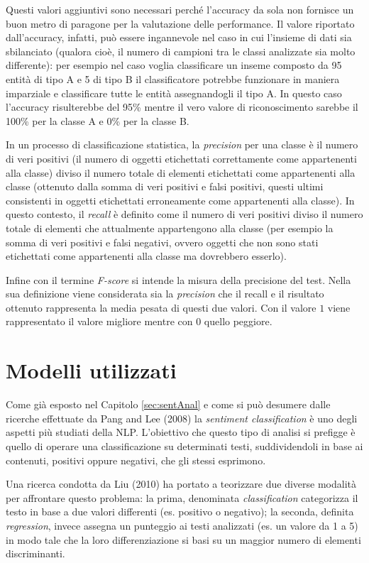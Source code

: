 \documentclass[a4paper,12pt,openright,twoside]{report}
\theoremstyle{definition}
\begin{document}
Questi valori aggiuntivi sono necessari perché l'accuracy da sola non fornisce un buon metro di paragone
per la valutazione delle performance. Il valore riportato dall'accuracy, infatti, può essere ingannevole
nel caso in cui l'insieme di dati sia sbilanciato (qualora cioè, il numero di campioni tra le classi analizzate
sia molto differente): per esempio nel caso voglia classificare un inseme composto da 95 entità di tipo A
e 5 di tipo B il classificatore potrebbe funzionare in maniera imparziale e classificare tutte le entità 
assegnandogli il tipo A. In questo caso l'accuracy risulterebbe del 95\% mentre il vero valore di riconoscimento
 sarebbe il 100\% per la classe A e 0\% per la classe B.

In un processo di classificazione statistica, la \emph{precision} per una classe è il numero di 
veri positivi (il numero di oggetti etichettati correttamente come appartenenti alla classe) 
diviso il numero totale di elementi etichettati come appartenenti alla classe 
(ottenuto dalla somma di veri positivi e falsi positivi, 
questi ultimi consistenti in oggetti etichettati erroneamente 
come appartenenti alla classe). In questo contesto, il \emph{recall} è definito come il numero 
di veri positivi diviso il numero totale di elementi che attualmente appartengono alla classe 
(per esempio la somma di veri positivi e falsi negativi, ovvero oggetti che non 
sono stati etichettati come appartenenti alla classe ma dovrebbero esserlo).

Infine con il termine \emph{F-score} si intende la misura della precisione del test. Nella sua
definizione viene considerata sia la \emph{precision} che il recall e il risultato ottenuto rappresenta
la media pesata di questi due valori. Con il valore $1$ viene rappresentato il valore migliore
mentre con 0 quello peggiore.

\section{Modelli utilizzati}
Come già esposto nel Capitolo \ref{sec:sentAnal} e come si può desumere
dalle ricerche effettuate da Pang and Lee (2008) %
la \emph{sentiment classification} è uno degli aspetti più studiati della NLP.
L’obiettivo che questo tipo di analisi si prefigge è quello di operare una classificazione su determinati testi, 
suddividendoli in base ai contenuti, positivi oppure negativi, che gli stessi esprimono. 

Una ricerca condotta da 
Liu (2010) %
ha portato a teorizzare due diverse modalità per affrontare questo problema: la prima, denominata
 \emph{classification}
categorizza il testo in base a due valori differenti (es. positivo o negativo); la seconda, definita 
\emph{regression}, invece assegna un punteggio ai testi analizzati (es. un valore da 1 a 5)
in modo tale che la loro differenziazione si basi su un maggior numero di elementi discriminanti.
\end{document}
